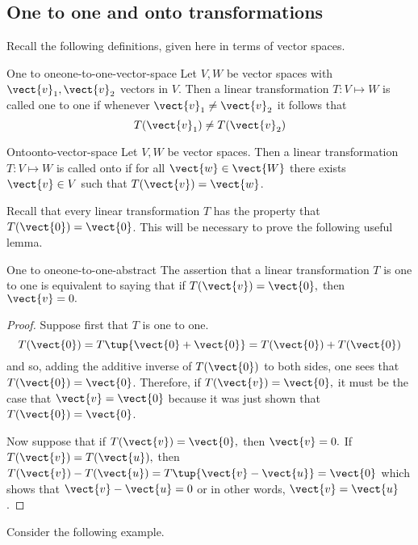 \subsection{One to one and onto transformations}

Recall the following definitions, given here in terms of vector spaces.

\begin{definition}{One to one}{one-to-one-vector-space}
Let $V, W$ be vector spaces with $\vect{v}_1, \vect{v}_2$ vectors in $V$. Then a linear transformation $T: V \mapsto W$ is called one to one if whenever $\vect{v}_1 \neq \vect{v}_2$ it follows that 
\[
T(\vect{v}_1) \neq T (\vect{v}_2)
\]
\end{definition}

\begin{definition}{Onto}{onto-vector-space}
Let $V, W$ be vector spaces. Then a linear transformation $T: V \mapsto W$ is called onto if for all $\vect{w} \in \vect{W}$ there exists $\vect{v} \in V$ such that $T(\vect{v}) = \vect{w}$. 
\end{definition}

Recall that every linear transformation $T$ has the property that $T(\vect{0})=\vect{0}$. This will be necessary to prove the following useful lemma. 

\begin{lemma}{One to one}{one-to-one-abstract}
The assertion that a linear transformation $T$ is one to one is equivalent to
saying that if $T(\vect{v})=\vect{0},$ then $\vect{v}=0.$ 
\end{lemma}

\begin{proof}
Suppose first that $T$ is one to one. 
\begin{equation*}
T(\vect{0})=T\tup{\vect{0}+\vect{0}} =T(\vect{0})+T(\vect{0})
\end{equation*}
and so, adding the additive inverse of $T(\vect{0})$ to both sides, one sees
that $T(\vect{0})=\vect{0}$. Therefore, if $T(\vect{v})=\vect{0},$ it must be the
case that $\vect{v}=\vect{0}$ because it was just shown that $T(\vect{0})=\vect{0}$.

Now suppose that if $T(\vect{v})=\vect{0},$ then $\vect{v}=0.$ If $T(\vect{v})=T(\vect{u}),$ then $T(\vect{v})-T(\vect{u})=T\tup{\vect{v}-\vect{u}} =\vect{0}$ which
shows that $\vect{v}-\vect{u}=0$ or in other words, $\vect{v}=\vect{u}$. 
\end{proof}

Consider the following example.

